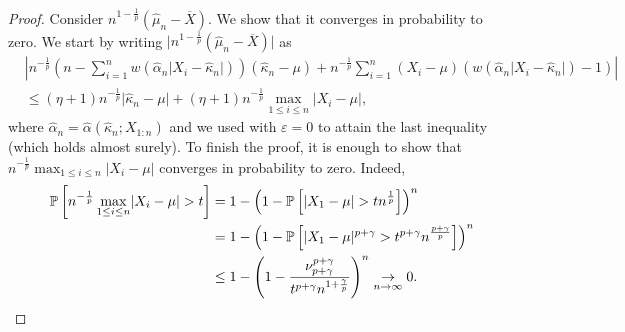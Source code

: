 \documentclass{article}
\theoremstyle{plain}
\theoremstyle{definition}
\renewcommand{\Pr}{\mathbb{P}}
\begin{document}
	\begin{proof}
		Consider \( n^{1-\frac{1}{p}}(\widehat{\mu}_n - \overline{X}) \). We show that it converges in probability to zero. We start by writing \( \lvert n^{1-\frac{1}{p}}(\widehat{\mu}_n -\overline{X} ) \rvert \) as \begin{align*}
      &\left\lvert n^{-\frac{1}{p}}\left(n-\sum_{i=1}^nw(\widehat{\alpha }_n \lvert X_i - \widehat{\kappa }_n  \rvert  )\right)(\widehat{\kappa }_n-\mu )+n^{-\frac{1}{p}} \sum_{i=1}^n (X_i-\mu )(w (\widehat{\alpha}_n \lvert X_i-\widehat{\kappa }_n \rvert )-1) \right\rvert \\
   & \le (\eta+1) n^{-\frac{1}{p}} \lvert \widehat{\kappa }_n-\mu \rvert + (\eta+1) n^{-\frac{1}{p}}\max_{1\le i\le n} \lvert X_i -\mu \rvert,
		\end{align*}
    where \( \widehat{\alpha }_n=\widehat{\alpha }(\widehat{\kappa }_n;X_{1:n} )   \) and we used  with \( \varepsilon = 0 \) to attain the last inequality (which holds almost surely).
		To finish the proof, it is enough to show that \( n^{-\frac{1}{p}}\max_{1\le i\le n} \lvert X_i -\mu \rvert \) converges in probability to zero. Indeed,
		\begin{align*}
      \ \Pr\left[ n^{-\frac{1}{p}}\max_{1\le i\le n} \lvert X_i -\mu \rvert > t \right] &= 1-\left(1-\Pr\left[\lvert X_1 -\mu \rvert > tn^{\frac{1}{p}}\right]\right)^n \\
 & = 1-\left(1-\Pr\left[\lvert X_1 -\mu \rvert^{p+\gamma  } > t^{p+\gamma }n^{\frac{p+\gamma }{p}}\right]\right)^n \\
        & \le 1-\left(1-\frac{\nu _{p+\gamma }^{p+\gamma }}{t^{p+\gamma }n^{1+\frac{\gamma}{p}}}\right)^n \underset{n\to \infty}{\to } 0. \qedhere
		\end{align*}
	\end{proof}
\end{document}
